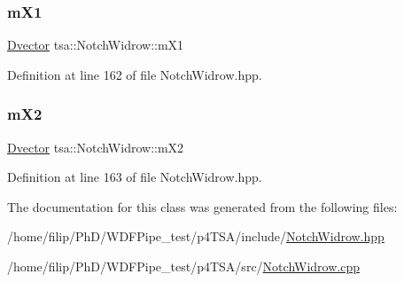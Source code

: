 \subsubsection{\texorpdfstring{m\+X1}{mX1}}
{\footnotesize\ttfamily \hyperlink{namespacetsa_a8900fb03d849baf447a1a0efe2561fb2}{Dvector} tsa\+::\+Notch\+Widrow\+::m\+X1\hspace{0.3cm}{\ttfamily [private]}}



Definition at line 162 of file Notch\+Widrow.\+hpp.

\mbox{\label{classtsa_1_1_notch_widrow_adde0e4f47ee24c548101b61e864da073}} 
\subsubsection{\texorpdfstring{m\+X2}{mX2}}
{\footnotesize\ttfamily \hyperlink{namespacetsa_a8900fb03d849baf447a1a0efe2561fb2}{Dvector} tsa\+::\+Notch\+Widrow\+::m\+X2\hspace{0.3cm}{\ttfamily [private]}}



Definition at line 163 of file Notch\+Widrow.\+hpp.



The documentation for this class was generated from the following files\+:\begin{DoxyCompactItemize}
\item 
/home/filip/\+Ph\+D/\+W\+D\+F\+Pipe\+\_\+test/p4\+T\+S\+A/include/\hyperlink{_notch_widrow_8hpp}{Notch\+Widrow.\+hpp}\item 
/home/filip/\+Ph\+D/\+W\+D\+F\+Pipe\+\_\+test/p4\+T\+S\+A/src/\hyperlink{_notch_widrow_8cpp}{Notch\+Widrow.\+cpp}\end{DoxyCompactItemize}
